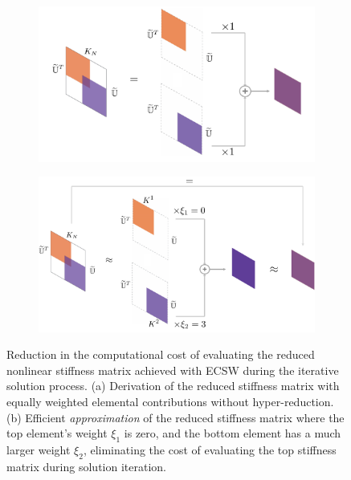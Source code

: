 \documentclass[11pt]{article}
\begin{document}
        \begin{figure}[t]
                \centering
                \begin{subfigure}{0.48\linewidth}
                    \hspace{-15pt}
                    \includegraphics[width=\linewidth]{K_red.pdf}
                    \caption{}
                    \label{fig:visual_FOM_FEA_2}
                \end{subfigure}%
            \begin{subfigure}{0.48\linewidth}
                        \centering
                        \includegraphics[width=\linewidth]{K_hyper_red.pdf}
                        \caption{}
                        \label{fig:visual_ROM_FEA}
                    \end{subfigure}
                \caption{Reduction in the computational cost of evaluating the reduced nonlinear stiffness matrix achieved with ECSW during the iterative solution process. (a) Derivation of the reduced stiffness matrix with equally weighted elemental contributions without hyper-reduction. (b) Efficient \textit{approximation} of the reduced stiffness matrix where the top element's weight \(\xi_1\) is zero, and the bottom element has a much larger weight \(\xi_2\), eliminating the cost of evaluating the top stiffness matrix during solution iteration.}
                \label{fig:stiffness_matrices}
            \end{figure}
\end{document}
